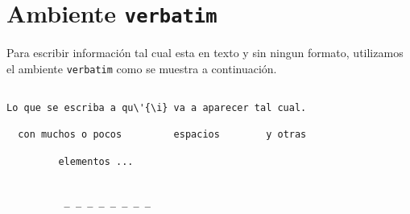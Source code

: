%
%

\section{Ambiente \texttt{verbatim}}

Para escribir informaci\'on tal cual esta en texto y sin ningun
formato, utilizamos el ambiente \texttt{verbatim} como se muestra a
continuaci\'on.

\begin{verbatim}

Lo que se escriba a qu\'{\i} va a aparecer tal cual.

  con muchos o pocos         espacios        y otras

         elementos ...


          _ _ _ _ _ _ _ _ 
\end{verbatim}
